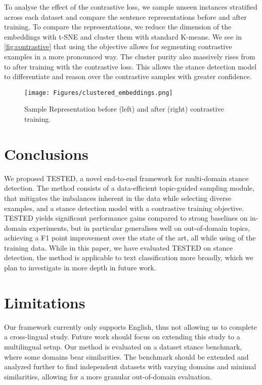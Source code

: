 \documentclass[11pt]{article}
\begin{document}
To analyse the effect of the contrastive loss, we sample  unseen instances stratified across each dataset and compare the sentence representations before and after training. To compare the representations, we reduce the dimension of the embeddings with t-SNE and cluster them with standard K-means. We see in \autoref{fig:contrastive} that using the objective allows for segmenting contrastive examples in a more pronounced way. The cluster purity also massively rises from  to  after training with the contrastive loss. This allows the stance detection model to differentiate and reason over the contrastive samples with greater confidence.

\begin{figure}
\centering
\texttt{[image: Figures/clustered\_embeddings.png]}
\caption{Sample Representation before (left) and after (right) contrastive training.}
\label{fig:contrastive}
\end{figure}

\section{Conclusions}
\label{sec:conclusions}

We proposed TESTED, a novel end-to-end framework for multi-domain stance detection. The method consists of a data-efficient topic-guided sampling module, that mitigates the imbalances inherent in the data while selecting diverse examples, and a stance detection model with a contrastive training objective. TESTED yields significant performance gains compared to strong baselines on in-domain experiments, but in particular generalises well on out-of-domain topics, achieving a  F1 point improvement over the state of the art, all while using  of the training data. While in this paper, we have evaluated TESTED on stance detection, the method is applicable to text classification more broadly, which we plan to investigate in more depth in future work. 

\section*{Limitations}

Our framework currently only supports English, thus not allowing us to complete a cross-lingual study. Future work should focus on extending this study to a multilingual setup. Our method is evaluated on a  dataset stance benchmark, where some domains bear similarities. The benchmark should be extended and analyzed further to find independent datasets with varying domains and minimal similarities, allowing for a more granular out-of-domain evaluation.
\end{document}
